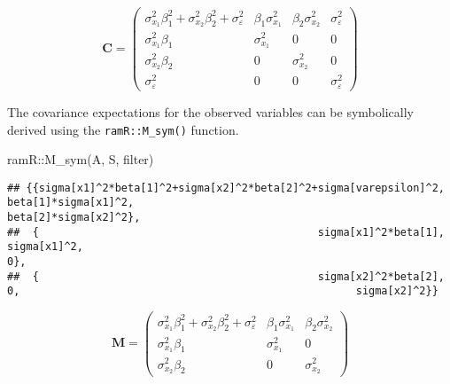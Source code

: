 \documentclass[
]{book}
\newenvironment{Shaded}{\begin{snugshade}}{\end{snugshade}}
\newcommand{\FunctionTok}[1]{\textcolor[rgb]{0.00,0.00,0.00}{#1}}
\newcommand{\NormalTok}[1]{#1}
\newcommand{\SpecialCharTok}[1]{\textcolor[rgb]{0.00,0.00,0.00}{#1}}
\theoremstyle{definition}
\theoremstyle{definition}
\theoremstyle{definition}
\theoremstyle{remark}
\begin{document}
\begin{equation*}\mathbf{C} =\left( \begin{array}{cccc} \sigma  _{x_{1}} ^{2} \beta  _{1} ^{2} + \sigma  _{x_{2}} ^{2} \beta  _{2} ^{2} + \sigma  _{\varepsilon } ^{2} & \beta  _{1} \sigma  _{x_{1}} ^{2} & \beta  _{2} \sigma  _{x_{2}} ^{2} & \sigma  _{\varepsilon } ^{2} \\ \sigma  _{x_{1}} ^{2} \beta  _{1} & \sigma  _{x_{1}} ^{2} & 0 & 0 \\ \sigma  _{x_{2}} ^{2} \beta  _{2} & 0 & \sigma  _{x_{2}} ^{2} & 0 \\ \sigma  _{\varepsilon } ^{2} & 0 & 0 & \sigma  _{\varepsilon } ^{2} \end{array} \right)\end{equation*}

The covariance expectations for the observed variables
can be symbolically derived using the \texttt{ramR::M\_sym()} function.

\begin{Shaded}
\begin{Highlighting}[]
\NormalTok{ramR}\SpecialCharTok{::}\FunctionTok{M\_sym}\NormalTok{(A, S, filter)}
\end{Highlighting}
\end{Shaded}

\begin{verbatim}
## {{sigma[x1]^2*beta[1]^2+sigma[x2]^2*beta[2]^2+sigma[varepsilon]^2,                                             beta[1]*sigma[x1]^2,                                             beta[2]*sigma[x2]^2},
##  {                                            sigma[x1]^2*beta[1],                                                     sigma[x1]^2,                                                               0},
##  {                                            sigma[x2]^2*beta[2],                                                               0,                                                     sigma[x2]^2}}
\end{verbatim}

\begin{equation*}\mathbf{M} =\left( \begin{array}{ccc} \sigma  _{x_{1}} ^{2} \beta  _{1} ^{2} + \sigma  _{x_{2}} ^{2} \beta  _{2} ^{2} + \sigma  _{\varepsilon } ^{2} & \beta  _{1} \sigma  _{x_{1}} ^{2} & \beta  _{2} \sigma  _{x_{2}} ^{2} \\ \sigma  _{x_{1}} ^{2} \beta  _{1} & \sigma  _{x_{1}} ^{2} & 0 \\ \sigma  _{x_{2}} ^{2} \beta  _{2} & 0 & \sigma  _{x_{2}} ^{2} \end{array} \right)\end{equation*}
\end{document}
